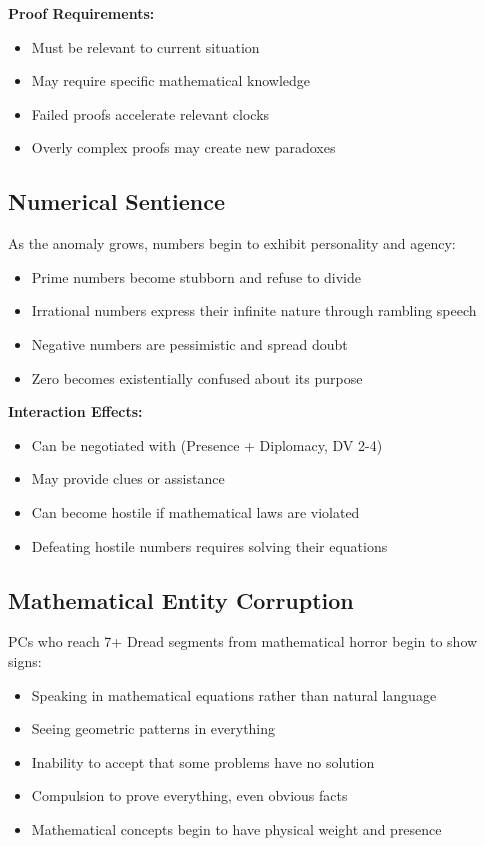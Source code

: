 \documentclass[11pt]{article}
\begin{document}
\textbf{Proof Requirements:}
\begin{itemize}
\item Must be relevant to current situation
\item May require specific mathematical knowledge
\item Failed proofs accelerate relevant clocks
\item Overly complex proofs may create new paradoxes
\end{itemize}

\subsection{Numerical Sentience}

As the anomaly grows, numbers begin to exhibit personality and agency:
\begin{itemize}
\item Prime numbers become stubborn and refuse to divide
\item Irrational numbers express their infinite nature through rambling speech
\item Negative numbers are pessimistic and spread doubt
\item Zero becomes existentially confused about its purpose
\end{itemize}

\textbf{Interaction Effects:}
\begin{itemize}
\item Can be negotiated with (Presence + Diplomacy, DV 2-4)
\item May provide clues or assistance
\item Can become hostile if mathematical laws are violated
\item Defeating hostile numbers requires solving their equations
\end{itemize}

\subsection{Mathematical Entity Corruption}

PCs who reach 7+ Dread segments from mathematical horror begin to show signs:
\begin{itemize}
\item Speaking in mathematical equations rather than natural language
\item Seeing geometric patterns in everything
\item Inability to accept that some problems have no solution
\item Compulsion to prove everything, even obvious facts
\item Mathematical concepts begin to have physical weight and presence
\end{itemize}
\end{document}
